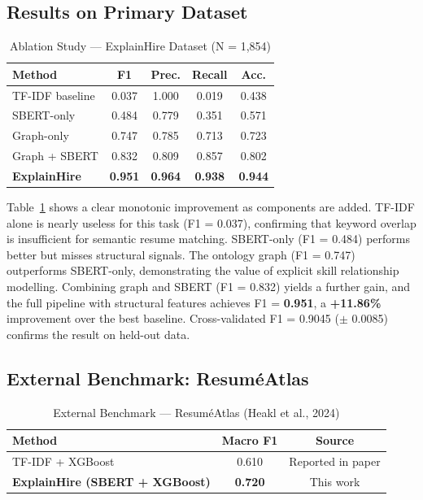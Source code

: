 \documentclass[conference]{IEEEtran}
\begin{document}
\subsection{Results on Primary Dataset}

\begin{table}[htbp]
\caption{Ablation Study --- ExplainHire Dataset (N = 1,854)}
\label{tab:ablation}
\centering
\begin{tabular}{lcccc}
\toprule
\textbf{Method} & \textbf{F1} & \textbf{Prec.} & \textbf{Recall} & \textbf{Acc.} \\
\midrule
TF-IDF baseline        & 0.037 & 1.000 & 0.019 & 0.438 \\
SBERT-only             & 0.484 & 0.779 & 0.351 & 0.571 \\
Graph-only             & 0.747 & 0.785 & 0.713 & 0.723 \\
Graph + SBERT          & 0.832 & 0.809 & 0.857 & 0.802 \\
\textbf{ExplainHire}   & \textbf{0.951} & \textbf{0.964} & \textbf{0.938} & \textbf{0.944} \\
\bottomrule
\end{tabular}
\end{table}

Table~\ref{tab:ablation} shows a clear monotonic improvement as components
are added. TF-IDF alone is nearly useless for this task (F1 = 0.037),
confirming that keyword overlap is insufficient for semantic resume matching.
SBERT-only (F1 = 0.484) performs better but misses structural signals.
The ontology graph (F1 = 0.747) outperforms SBERT-only, demonstrating the
value of explicit skill relationship modelling. Combining graph and SBERT
(F1 = 0.832) yields a further gain, and the full pipeline with structural
features achieves F1 = \textbf{0.951}, a \textbf{+11.86\%} improvement over
the best baseline. Cross-validated F1 = 0.9045 ($\pm$ 0.0085) confirms
the result on held-out data.

\subsection{External Benchmark: Resum\'eAtlas}

\begin{table}[htbp]
\caption{External Benchmark --- Resum\'eAtlas (Heakl et al., 2024)}
\label{tab:benchmark}
\centering
\begin{tabular}{lcc}
\toprule
\textbf{Method} & \textbf{Macro F1} & \textbf{Source} \\
\midrule
TF-IDF + XGBoost~\cite{heakl2024resumeatlas} & 0.610 & Reported in paper \\
\textbf{ExplainHire (SBERT + XGBoost)}       & \textbf{0.720} & This work \\
\bottomrule
\end{tabular}
\end{table}
\end{document}

